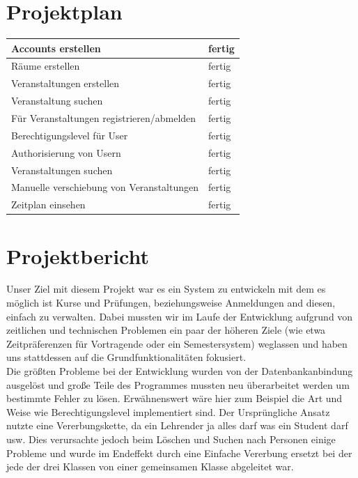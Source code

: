 \documentclass[a4paper,12pt]{article}
\begin{document}
\section*{Projektplan}
\begin{tabular}{|l|l|}
	\hline
	Accounts erstellen & fertig \\ \hline
	Räume erstellen & fertig \\ \hline
	Veranstaltungen erstellen & fertig \\ \hline
	Veranstaltung suchen & fertig \\ \hline
	Für Veranstaltungen registrieren/abmelden & fertig \\ \hline
	Berechtigungslevel für User & fertig \\ \hline
	Authorisierung von Usern & fertig \\ \hline
	Veranstaltungen suchen & fertig \\ \hline
	Manuelle verschiebung von Veranstaltungen & fertig \\ \hline
	Zeitplan einsehen & fertig \\ \hline
\end{tabular}
\section*{Projektbericht}
Unser Ziel mit diesem Projekt war es ein System zu entwickeln mit dem es möglich ist Kurse und Prüfungen, beziehungsweise Anmeldungen and diesen, einfach zu verwalten. Dabei mussten wir im Laufe der Entwicklung aufgrund von zeitlichen und technischen Problemen ein paar der höheren Ziele (wie etwa Zeitpräferenzen für Vortragende oder ein Semestersystem) weglassen und haben uns stattdessen auf die Grundfunktionalitäten fokusiert. \\
Die größten Probleme bei der Entwicklung wurden von der Datenbankanbindung ausgelöst und große Teile des Programmes mussten neu überarbeitet werden um bestimmte Fehler zu lösen. Erwähnenswert wäre hier zum Beispiel die Art und Weise wie Berechtigungslevel implementiert sind. Der Ursprüngliche Ansatz nutzte eine Vererbungskette, da ein Lehrender ja alles darf was ein Student darf usw. Dies verursachte jedoch beim Löschen und Suchen nach Personen einige Probleme und wurde im Endeffekt durch eine Einfache Vererbung ersetzt bei der jede der drei Klassen von einer gemeinsamen Klasse abgeleitet war.
\end{document}
